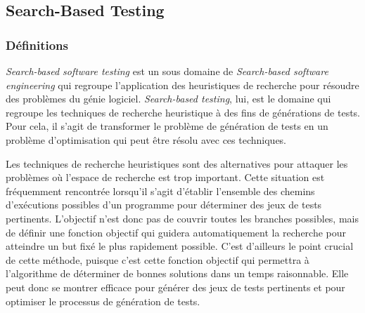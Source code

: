 
\subsection{Search-Based Testing}

\subsubsection*{Définitions}
\textit{Search-based software testing}\cite{search-based-testing} est un sous domaine de \textit{Search-based software engineering}\cite{search-based-software-engineering} qui regroupe l'application des heuristiques de recherche pour résoudre des problèmes du génie logiciel.
\textit{Search-based testing}, lui, est le domaine qui regroupe les techniques de recherche heuristique à des fins de générations de tests. Pour cela, il s'agit de transformer le problème de génération de tests en un problème d'optimisation qui peut être résolu avec ces techniques.

Les techniques de recherche heuristiques sont des alternatives pour attaquer les problèmes où l'espace de recherche est trop important. Cette situation est fréquemment rencontrée lorsqu'il s'agit d'établir l'ensemble des chemins d'exécutions possibles d'un programme pour déterminer des jeux de tests pertinents.
L'objectif n'est donc pas de couvrir toutes les branches possibles, mais de définir une fonction objectif qui guidera automatiquement la recherche pour atteindre un but fixé le plus rapidement possible. C'est d'ailleurs le point crucial de cette méthode, puisque c'est cette fonction objectif qui permettra à l'algorithme de déterminer de bonnes solutions dans un temps raisonnable.
Elle peut donc se montrer efficace pour générer des jeux de tests pertinents et pour optimiser le processus de génération de tests.

